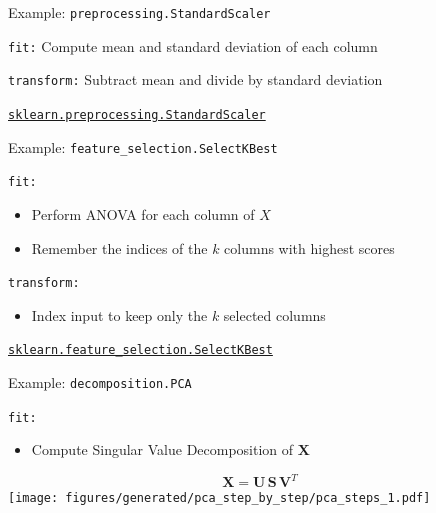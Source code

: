 \documentclass[presentation,mathserif,table]{beamer}
\newcommand{\X}{{\mathbold X}}
\newcommand{\bS}{{\mathbold S}}
\newcommand{\U}{{\mathbold U}}
\newcommand{\V}{{\mathbold V}}
\begin{document}
\begin{frame}[label={sec:org911714e},fragile]{Example: \texttt{preprocessing.StandardScaler}}
 \begin{block}{\texttt{fit:}}
Compute mean and standard deviation of each column
\end{block}
\begin{block}{\texttt{transform:}}
Subtract mean and divide by standard deviation
\end{block}
\begin{structureenv} %
\href{https://scikit-learn.org/stable/modules/generated/sklearn.preprocessing.StandardScaler.html\#sklearn.preprocessing.StandardScaler}{\texttt{sklearn.preprocessing.StandardScaler}}
\end{structureenv}
\end{frame}
\begin{frame}[label={sec:org6722081},fragile]{Example: \texttt{feature\_selection.SelectKBest}}
 \begin{block}{\texttt{fit:}}
\begin{itemize}
\item Perform ANOVA for each column of \(X\)
\item Remember the indices of the \(k\) columns with highest scores
\end{itemize}
\end{block}
\begin{block}{\texttt{transform:}}
\begin{itemize}
\item Index input to keep only the \(k\) selected columns
\end{itemize}
\end{block}


\begin{structureenv} %
\href{https://scikit-learn.org/stable/modules/generated/sklearn.feature\_selection.SelectKBest.html\#sklearn.feature\_selection.SelectKBest}{\texttt{sklearn.feature\_selection.SelectKBest}}
\end{structureenv}
\end{frame}

\begin{frame}[label={sec:orgac53f12},fragile]{Example: \texttt{decomposition.PCA}}
 \begin{block}{\texttt{fit:}}
\begin{itemize}
\item Compute Singular Value Decomposition of \(\X\)
\end{itemize}
\begin{structureenv} %
\begin{equation}
\X = \U \, \bS \, \V^T
\end{equation}
\texttt{[image: figures/generated/pca\_step\_by\_step/pca\_steps\_1.pdf]}
\end{structureenv}
\end{block}
\end{frame}
\end{document}
